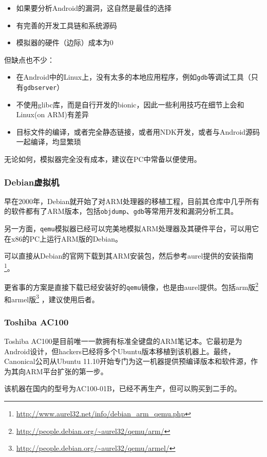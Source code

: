 \begin{itemize}
\item 如果要分析Android的漏洞，这自然是最佳的选择
\item 有完善的开发工具链和系统源码
\item 模拟器的硬件（边际）成本为0
\end{itemize}

但缺点也不少：

\begin{itemize}
\item 在Android中的Linux上，没有太多的本地应用程序，例如\lstinline!gdb!等调试工具（只有\lstinline!gdbserver!）
\item 不使用glibc库，而是自行开发的bionic，因此一些利用技巧在细节上会和Linux(on ARM)有差异
\item 目标文件的编译，或者完全静态链接，或者用NDK开发，或者与Android源码一起编译，均显繁琐
\end{itemize}

无论如何，模拟器完全没有成本，建议在PC中常备以便使用。

\subsubsection{Debian虚拟机}
早在2000年，Debian就开始了对ARM处理器的移植工程，目前其仓库中几乎所有的软件都有了ARM版本，包括\lstinline!objdump!、\lstinline!gdb!等常用开发和漏洞分析工具。

另一方面，\lstinline!qemu!模拟器已经可以完美地模拟ARM处理器及其硬件平台，可以用它在x86的PC上运行ARM版的Debian。

可以直接从Debian的官网下载到其ARM安装包，然后参考aurel提供的安装指南\footnote{\url{http://www.aurel32.net/info/debian\_arm\_qemu.php}}。

更省事的方案是直接下载已经安装好的\lstinline!qemu!镜像，也是由aurel提供。包括arm版\footnote{\url{http://people.debian.org/~aurel32/qemu/arm/}}
和armel版\footnote{\url{http://people.debian.org/~aurel32/qemu/armel/}}
，建议使用后者。

\subsubsection{Toshiba AC100}
Toshiba AC100是目前唯一一款拥有标准全键盘的ARM笔记本。它最初是为Android设计，但hackers已经将多个Ubuntu版本移植到该机器上。最终，Canonical公司从Ubuntu 11.10开始专门为这一机器提供预编译版本和软件源，作为其向ARM平台扩张的第一步。

该机器在国内的型号为AC100-01B，已经不再生产，但可以购买到二手的。

